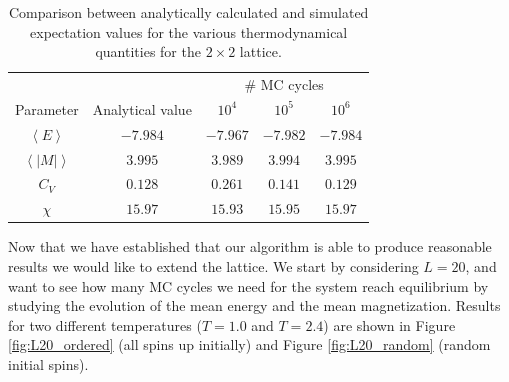 \documentclass[12pt, a4paper]{article}
\begin{document}
\begin{table}[ht!]
\caption{Comparison between analytically calculated and simulated expectation values for the various 
thermodynamical quantities for the $2\times 2$ lattice.}
\label{tab:analytical_vs_sim}
\begin{center}
\begin{tabular}{ccccc} \hline\hline
 & & \multicolumn{3}{c}{$\#$ MC cycles} \\ 
Parameter & Analytical value & $10^4$ & $10^5$  & $10^6$ \\ \hline
$\left\langle E \right\rangle$ & $-7.984$ & $-7.967$ & $-7.982$ & $-7.984$ \\ 
$\left\langle |M| \right\rangle$ & $3.995$  & $3.989$  & $3.994$  & $3.995$  \\
$C_V$                          & $0.128$  & $0.261$  & $0.141$  & $0.129$  \\
$\chi$						   & $15.97$  & $15.93$  & $15.95$  & $15.97$  \\ \hline\hline
\end{tabular}
\end{center}
\end{table}

Now that we have established that our algorithm is able to produce reasonable results we would like 
to extend the lattice. We start by considering $L=20$, and want to see how many MC cycles we need for the 
system reach equilibrium by studying the evolution of the mean energy and the mean magnetization.  
Results for two different temperatures ($T=1.0$ and $T=2.4$) are shown in Figure \ref{fig:L20_ordered} 
(all spins up initially) and Figure \ref{fig:L20_random} (random initial spins). 
\end{document}

